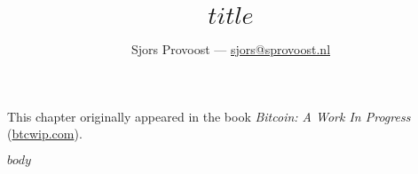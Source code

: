 \documentclass[$paper$paper,twocolumn,11pt]{article}
\title{$title$}
\author{Sjors Provoost — \href{mailto:sjors@sprovoost.nl}{sjors@sprovoost.nl}}
\begin{document}
\maketitle

This chapter originally appeared in the book \emph{Bitcoin: A Work In Progress} (\href{https://btcwip.com/}{btcwip.com}).

\bigskip

$body$
\end{document}
